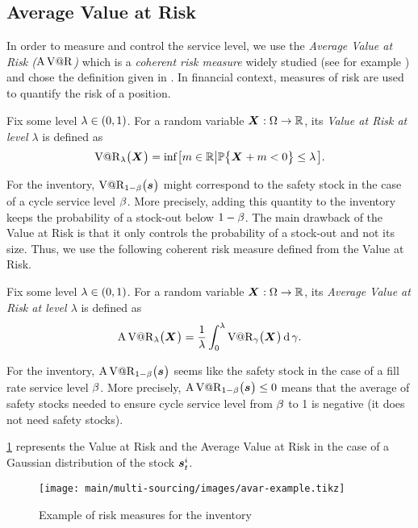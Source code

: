 \subsection{Average Value at Risk}


In order to measure and control the service level, we use the \emph{Average Value at Risk ($\operatorname{A\operatorname{V@R}}$)} which is a \emph{coherent risk measure} widely studied (see for example \cite{Artzner1999,Rockafellar2000,Rockafellar2002}) and chose the definition given in \cite{Follmer2004}.
In financial context, measures of risk are used to quantify the risk of a position.


Fix some level $\lambda\in\bracket{0,1}$. For a random variable $\va X:\scenarios\to\RR$, its \emph{Value at Risk at level $\lambda$} is defined as
\begin{equation}
\VaR_{\lambda}\bracket{\va X} = \inf\sqbracket{m\in\RR\left|\prob\crbracket{\va X+m<0}\le\lambda\right.}.
\end{equation}


For the inventory, $\VaR_{1-\servicelvl}\bracket{\va\inventory}$ might correspond to the safety stock in the case of a cycle service level $\beta$.
More precisely, adding this quantity to the inventory keeps the probability of a stock-out below $1-\beta$.
The main drawback of the Value at Risk is that it only controls the probability of a stock-out and not its size.
Thus, we use the following coherent risk measure defined from the Value at Risk.


Fix some level $\lambda\in\bracket{0,1}$. For a random variable $\va X:\scenarios\to\RR$, its \emph{Average Value at Risk at level $\lambda$} is defined as
\begin{equation}
\AVaR_{\lambda}\bracket{\va X} = \frac{1}{\lambda}\int_0^{\lambda}\VaR_{\gamma}\bracket{\va X}\diff\gamma.
\end{equation}


For the inventory, $\AVaR_{1-\servicelvl}\bracket{\va\inventory}$ seems like the safety stock in the case of a fill rate service level $\beta$.
More precisely, $\AVaR_{1-\servicelvl}\bracket{\va\inventory}\le 0$ means that the average of safety stocks needed to ensure cycle service level from $\beta$ to 1 is negative (\ie it does not need safety stocks).


\cref{fig:avar-examples} represents the Value at Risk and the Average Value at Risk in the case of a Gaussian distribution of the stock $\va\inventory_t^i$.


\begin{figure}[h]
  \centering
  \texttt{[image: main/multi-sourcing/images/avar-example.tikz]}
  \caption{Example of risk measures for the inventory}
  \label{fig:avar-examples}
\end{figure}



